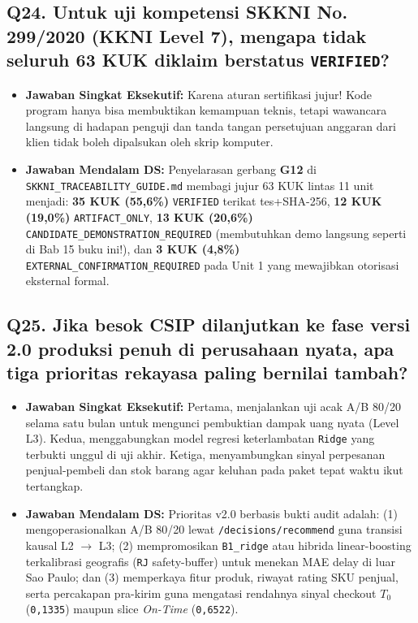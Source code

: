 \documentclass[11pt,a4paper,oneside]{book}
\newcommand{\code}[1]{{\small\nolinkurl{#1}}}
\begin{document}
\subsection*{Q24. Untuk uji kompetensi SKKNI No. 299/2020 (KKNI Level 7), mengapa tidak seluruh 63 KUK diklaim berstatus \texttt{VERIFIED}?}
\begin{itemize}
  \item \textbf{Jawaban Singkat Eksekutif:} Karena aturan sertifikasi jujur! Kode program hanya bisa membuktikan kemampuan teknis, tetapi wawancara langsung di hadapan penguji dan tanda tangan persetujuan anggaran dari klien tidak boleh dipalsukan oleh skrip komputer.
  \item \textbf{Jawaban Mendalam DS:} Penyelarasan gerbang \textbf{G12} di \code{SKKNI_TRACEABILITY_GUIDE.md} membagi jujur 63 KUK lintas 11 unit menjadi: \textbf{35 KUK (55,6\%)} \code{VERIFIED} terikat tes+SHA-256, \textbf{12 KUK (19,0\%)} \code{ARTIFACT_ONLY}, \textbf{13 KUK (20,6\%)} \code{CANDIDATE_DEMONSTRATION_REQUIRED} (membutuhkan demo langsung seperti di Bab 15 buku ini!), dan \textbf{3 KUK (4,8\%)} \code{EXTERNAL_CONFIRMATION_REQUIRED} pada Unit 1 yang mewajibkan otorisasi eksternal formal.
\end{itemize}

\subsection*{Q25. Jika besok CSIP dilanjutkan ke fase versi 2.0 produksi penuh di perusahaan nyata, apa tiga prioritas rekayasa paling bernilai tambah?}
\begin{itemize}
  \item \textbf{Jawaban Singkat Eksekutif:} Pertama, menjalankan uji acak A/B 80/20 selama satu bulan untuk mengunci pembuktian dampak uang nyata (Level L3). Kedua, menggabungkan model regresi keterlambatan \code{Ridge} yang terbukti unggul di uji akhir. Ketiga, menyambungkan sinyal perpesanan penjual-pembeli dan stok barang agar keluhan pada paket tepat waktu ikut tertangkap.
  \item \textbf{Jawaban Mendalam DS:} Prioritas v2.0 berbasis bukti audit adalah: (1) mengoperasionalkan A/B 80/20 lewat \code{/decisions/recommend} guna transisi kausal L2 $\rightarrow$ L3; (2) mempromosikan \code{B1_ridge} atau hibrida linear-boosting terkalibrasi geografis (\code{RJ} safety-buffer) untuk menekan MAE delay di luar Sao Paulo; dan (3) memperkaya fitur produk, riwayat rating SKU penjual, serta percakapan pra-kirim guna mengatasi rendahnya sinyal checkout $T_0$ (\code{0,1335}) maupun slice \emph{On-Time} (\code{0,6522}).
\end{itemize}
\end{document}
